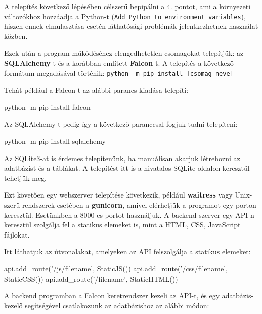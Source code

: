 A telepítés következő lépésében célszerű bepipálni a 4. pontot, ami a környezeti változókhoz hozzáadja a Python-t (\texttt{Add Python to environment variables}), hiszen ennek elmulasztása esetén láthatósági problémák jelentkezhetnek használat közben.


Ezek után a program működéséhez elengedhetetlen csomagokat telepítjük: az \textbf{SQLAlchemy}-t és a korábban említett \textbf{Falcon}-t. A telepítés a következő formátum megadásával történik: \texttt{python -m pip install [csomag neve]}

Tehát például a Falcon-t az alábbi parancs kiadása telepíti:

\begin{python}
python -m pip install falcon
\end{python}

Az SQLAlchemy-t pedig így a következő paranccsal fogjuk tudni telepíteni:
\begin{python}
python -m pip install sqlalchemy
\end{python}

Az SQLite3-at is érdemes telepítenünk, ha manuálisan akarjuk létrehozni az adatbázist és a táblákat. A telepítést itt is a hivatalos SQLite oldalon \cite{sqlite} keresztül tehetjük meg.

Ezt követően egy webszerver telepítése következik, például \textbf{waitress} vagy Unix-szerű rendszerek esetében a \textbf{gunicorn}, amivel elérhetjük a programot egy porton keresztül. Esetünkben a 8000-es portot használjuk. A backend szerver egy API-n keresztül szolgálja fel a statikus elemeket is, mint a HTML, CSS, JavaScript fájlokat.
 
Itt láthatjuk az útvonalakat, amelyeken az API felszolgálja a statikus elemeket:

\begin{python}
api.add_route('/js/{filename}', StaticJS())
api.add_route('/css/{filename}', StaticCSS())
api.add_route('/{filename}', StaticHTML())
\end{python}

A backend programban a Falcon keretrendszer kezeli az API-t, és egy adatbázis-kezelő segítségével csatlakozunk az adatbázishoz az alábbi módon:

